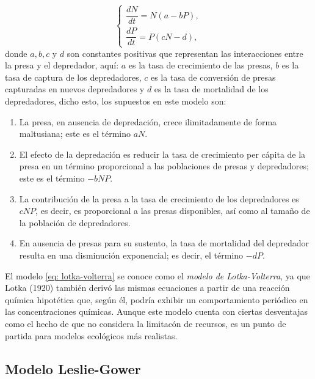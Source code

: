 \begin{equation}
	\left\{
	\begin{aligned}
		\dfrac{dN}{dt} = N(a-bP), \\
		\dfrac{dP}{dt} = P(cN-d),
	\end{aligned}
	\right.
	\label{eq: lotka-volterra}
\end{equation}
donde $a,b,c$ y $d$ son constantes positivas que representan las interacciones entre la presa y el depredador, aquí: $a$ es la tasa de crecimiento de las presas, $b$ es la tasa de captura de los depredadores, $c$ es la tasa de conversión de presas capturadas en nuevos depredadores y $d$ es la tasa de mortalidad de los depredadores, dicho esto, los supuestos en este modelo son:
\begin{enumerate}
	\item La presa, en ausencia de depredación, crece ilimitadamente de forma maltusiana; este es el término $aN$.
	\item El efecto de la depredación es reducir la tasa de crecimiento per cápita de la presa en un término proporcional a las poblaciones de presas y depredadores; este es el término $-bNP$.
	\item La contribución de la presa a la tasa de crecimiento de los depredadores es $cNP$, es decir, es proporcional a las presas disponibles, así como al tamaño de la población de depredadores.
	\item En ausencia de presas para su sustento, la tasa de mortalidad del depredador resulta en una disminución exponencial; es decir, el término $-dP$.
\end{enumerate}
El modelo \eqref{eq: lotka-volterra} se conoce como el \textit{modelo de Lotka-Volterra}, ya que Lotka (1920) también derivó las mismas ecuaciones a partir de una reacción química hipotética que, según él, podría exhibir un comportamiento periódico en las concentraciones químicas. Aunque este modelo cuenta con ciertas desventajas como el hecho de que no considera la limitacón de recursos, es un punto de partida para modelos ecológicos más realistas.

\subsection{Modelo Leslie-Gower}

